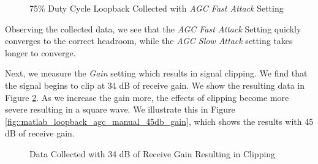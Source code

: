 \documentclass{article}
\begin{document}
\begin{figure}[H]
	\centerline{}
	\caption{75\% Duty Cycle Loopback Collected with \textit{AGC Fast Attack} Setting}
	\label{fig::matlab_loopback_agc_fast_attack_75p_duty_cycle}
\end{figure}

Observing the collected data, we see that the \textit{AGC Fast Attack} Setting quickly converges to the correct headroom, while the 
\textit{AGC Slow Attack} setting takes longer to converge.

Next, we measure the \textit{Gain} setting which results in signal clipping. We find that the signal begins to clip at 34 dB of receive gain. We show the resulting data in Figure \ref{fig::matlab_loopback_agc_manual_34db_gain}. As we increase the gain more, the effects of clipping become more severe resulting in a square wave. We illustrate this in Figure \ref{fig::matlab_loopback_agc_manual_45db_gain}, which shows the results with 45 dB of receive gain.

\begin{figure}[H]
	\centerline{}
	\caption{Data Collected with 34 dB of Receive Gain Resulting in Clipping}
	\label{fig::matlab_loopback_agc_manual_34db_gain}
\end{figure}
\end{document}
